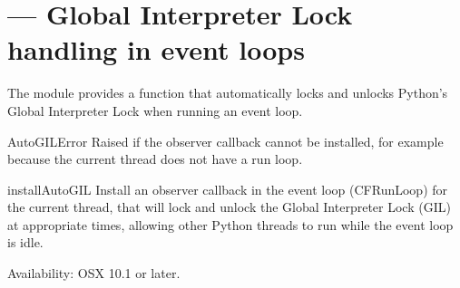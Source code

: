 \section{ ---
         Global Interpreter Lock handling in event loops}



The  module provides a function  that
automatically locks and unlocks Python's Global Interpreter Lock
when running an event loop.

\begin{excdesc}{AutoGILError}
Raised if the observer callback cannot be installed, for example because
the current thread does not have a run loop.
\end{excdesc}

\begin{funcdesc}{installAutoGIL}{}
	Install an observer callback in the event loop (CFRunLoop) for the
	current thread, that will lock and unlock the Global Interpreter Lock
	(GIL) at appropriate times, allowing other Python threads to run while
	the event loop is idle.
	
	Availability: OSX 10.1 or later.
\end{funcdesc}
